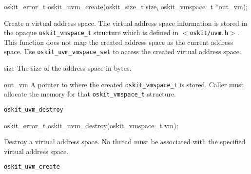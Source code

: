 \begin{apisyn}

        \funcproto oskit_error_t oskit_uvm_create(oskit_size_t size, \outparam oskit_vmspace_t *out_vm);
\end{apisyn}
\begin{apidesc}
        Create a virtual address space.  The virtual address space
        information is stored in the opaque \texttt{oskit_vmspace_t}
        structure which is defined in \texttt{$<$oskit/uvm.h$>$}. This
        function does not map the created address space as the current
        address space.  Use {\tt oskit_uvm_vmspace_set} to access
        the created virtual address space.

\end{apidesc}
\begin{apiparm}
        \item[size]
                The size of the address space in bytes.
        \item[out_vm]
                A pointer to where the created
                \texttt{oskit_vmspace_t} is stored.  Caller must
                allocate the memory for that \texttt{oskit_vmspace_t}
                structure.
\end{apiparm}
\begin{apirel}
        {\tt oskit_uvm_destroy}
\end{apirel}

\begin{apisyn}

        \funcproto oskit_error_t oskit_uvm_destroy(oskit_vmspace_t vm);
\end{apisyn}
\begin{apidesc}
        Destroy a virtual address space.  No thread must be associated
        with the specified virtual address space.
\end{apidesc}
\begin{apirel}
        {\tt oskit_uvm_create}
\end{apirel}

